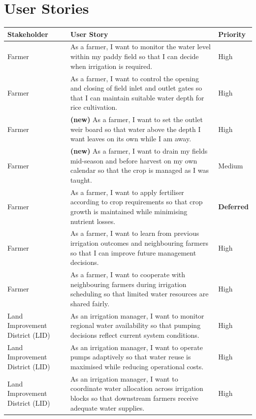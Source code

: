 \documentclass{article}
\begin{document}
\section{User Stories}
\begin{changed}
\centering
\small
{}
\begin{tabular}{|p{2.8cm}|p{10.8cm}|p{2.6cm}|}
\hline
\rowcolor[HTML]{F8F319}
\textbf{Stakeholder} & \textbf{User Story} & \textbf{Priority} \\ \hline
Farmer & As a farmer, I want to monitor the water level within my paddy field so that I can decide when irrigation is required. & High \\ \hline
Farmer & As a farmer, I want to control the opening and closing of field inlet and outlet gates so that I can maintain suitable water depth for rice cultivation. & High \\ \hline
Farmer & \textbf{(new)} As a farmer, I want to set the outlet weir board so that water above the depth I want leaves on its own while I am away. & High \\ \hline
Farmer & \textbf{(new)} As a farmer, I want to drain my fields mid-season and before harvest on my own calendar so that the crop is managed as I was taught. & Medium \\ \hline
Farmer & As a farmer, I want to apply fertiliser according to crop requirements so that crop growth is maintained while minimising nutrient losses. & \textbf{Deferred} \\ \hline
Farmer & As a farmer, I want to learn from previous irrigation outcomes and neighbouring farmers so that I can improve future management decisions. & High \\ \hline
Farmer & As a farmer, I want to cooperate with neighbouring farmers during irrigation scheduling so that limited water resources are shared fairly. & High \\ \hline
Land Improvement District (LID) & As an irrigation manager, I want to monitor regional water availability so that pumping decisions reflect current system conditions. & High \\ \hline
Land Improvement District (LID) & As an irrigation manager, I want to operate pumps adaptively so that water reuse is maximised while reducing operational costs. & High \\ \hline
Land Improvement District (LID) & As an irrigation manager, I want to coordinate water allocation across irrigation blocks so that downstream farmers receive adequate water supplies. & High \\ \hline

\end{tabular}
\end{changed}
\end{document}
